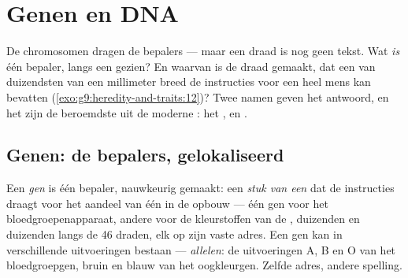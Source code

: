 \chapter{Genen en DNA}\label{ch:g9:genes-and-dna}

De chromosomen dragen de bepalers --- maar een draad is nog
geen tekst. Wat \emph{is} één bepaler, langs een 
gezien? En waarvan is de draad gemaakt, dat een  van
duizendsten van een millimeter breed de instructies voor een
heel mens kan bevatten
(\cref{exo:g9:heredity-and-traits:12})? Twee namen geven het
antwoord, en het zijn de beroemdste uit de moderne :
het , en .

\section{Genen: de bepalers, gelokaliseerd}

\begin{definition}\label{def:g9:genes-and-dna:gene}
Een \emph{gen} is één bepaler, nauwkeurig gemaakt:
een \emph{stuk van een } dat de instructies draagt
voor het aandeel van één  in de opbouw --- één gen voor
het bloedgroepenapparaat, andere voor de kleurstoffen van de
, duizenden en duizenden langs de 46 draden, elk op zijn
vaste adres. Een gen kan in verschillende uitvoeringen bestaan
--- \emph{allelen}: de uitvoeringen A, B en O van
het bloedgroepgen, bruin en blauw van het oogkleurgen. Zelfde
adres, andere spelling.
\end{definition}

